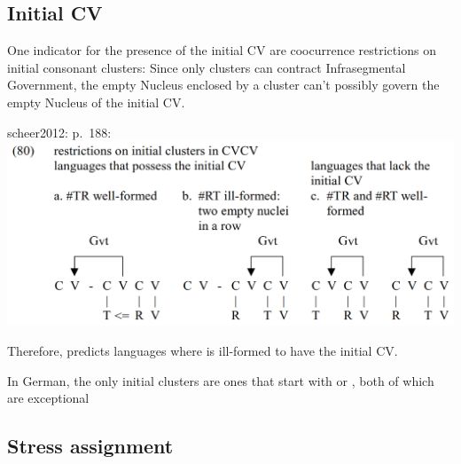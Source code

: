 \subsection{Initial CV}
One indicator for the presence of the initial CV are coocurrence restrictions
on initial consonant clusters:
Since only  clusters can contract Infrasegmental Government,
the empty Nucleus enclosed by a  cluster can't possibly govern
the empty Nucleus of the initial CV.

scheer2012: p.~188:
\includegraphics[width=.5\textwidth]{figures/scheer2012_initial-cv-initial-clusters.png}

Therefore, \CVCV predicts languages where  is ill-formed to have
the initial CV.

In German, the only initial  clusters are ones that start with
\textipa{[s]} or \textipa{[S]}, both of which are exceptional \TODO{}



\subsection{Stress assignment}
\TODO{}